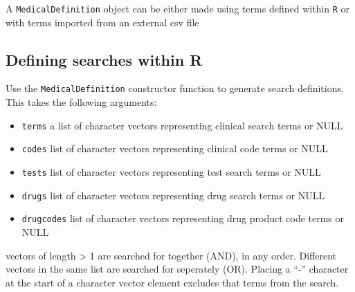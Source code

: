 \documentclass[]{article}
\begin{document}
A \texttt{MedicalDefinition} object can be either made using terms
defined within \texttt{R} or with terms imported from an external csv
file

\subsection{Defining searches within
R}\label{defining-searches-within-r}

Use the \texttt{MedicalDefinition} constructor function to generate
search definitions. This takes the following arguments:

\begin{itemize}
\itemsep1pt\parskip0pt
\item
  \texttt{terms} a list of character vectors representing clinical
  search terms or NULL
\item
  \texttt{codes} list of character vectors representing clinical code
  terms or NULL
\item
  \texttt{tests} list of character vectors representing test search
  terms or NULL
\item
  \texttt{drugs} list of character vectors representing drug search
  terms or NULL
\item
  \texttt{drugcodes} list of character vectors representing drug product
  code terms or NULL
\end{itemize}

vectors of length \textgreater{} 1 are searched for together (AND), in
any order. Different vectors in the same list are searched for
seperately (OR). Placing a ``-'' character at the start of a character
vector element excludes that terms from the search.
\end{document}
